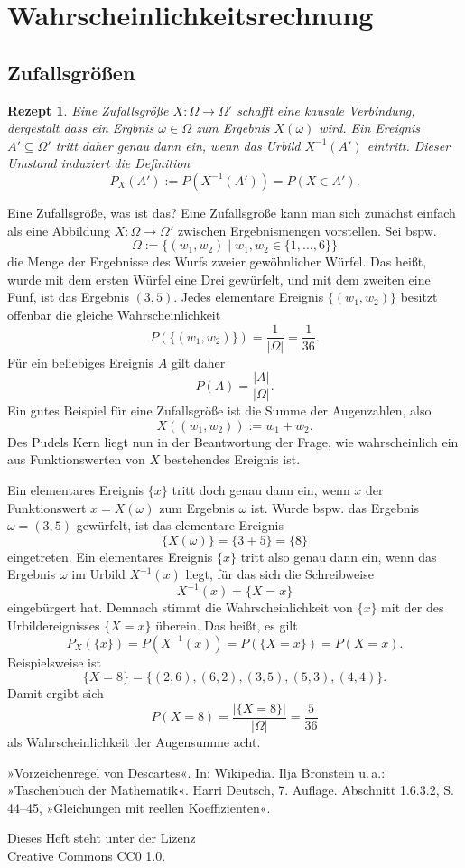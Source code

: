 \documentclass[a4paper,10pt,fleqn,twocolumn,twoside,dvipdfmx]{scrartcl}
\theoremstyle{rmbox}
\newtheorem{Rezept}{Rezept}[section]
\begin{document}
\clearpage
\section{Wahrscheinlichkeitsrechnung}

\subsection{Zufallsgrößen}

\begin{Rezept}
Eine Zufallsgröße $X\colon\Omega\to\Omega'$ schafft eine kausale
Verbindung, dergestalt dass ein Ergbnis $\omega\in\Omega$ zum
Ergebnis $X(\omega)$ wird. Ein Ereignis $A'\subseteq\Omega'$
tritt daher genau dann ein, wenn das Urbild $X^{-1}(A')$ eintritt.
Dieser Umstand induziert die Definition
\[P_X(A') := P(X^{-1}(A')) = P(X\in A').\]
\end{Rezept}

\noindent
Eine Zufallsgröße, was ist das? Eine Zufallsgröße kann man sich
zunächst einfach als eine Abbildung $X\colon\Omega\to\Omega'$ zwischen
Ergebnismengen vorstellen. Sei bspw.
\[\Omega := \{(w_1,w_2)\mid w_1,w_2\in\{1,\ldots,6\}\}\]
die Menge der Ergebnisse des Wurfs zweier gewöhnlicher
Würfel. Das heißt, wurde mit dem ersten Würfel eine Drei
gewürfelt, und mit dem zweiten eine Fünf, ist das Ergebnis $(3, 5)$.
Jedes elementare Ereignis $\{(w_1,w_2)\}$ besitzt offenbar
die gleiche Wahrscheinlichkeit%
\[P(\{(w_1,w_2)\}) = \frac{1}{|\Omega|} = \frac{1}{36}.\]
Für ein beliebiges Ereignis $A$ gilt daher%
\[P(A) = \frac{|A|}{|\Omega|}.\]
Ein gutes Beispiel für eine Zufallsgröße ist die Summe der
Augenzahlen, also%
\[X((w_1,w_2)) := w_1 + w_2.\]
Des Pudels Kern liegt nun in der Beantwortung der Frage, wie
wahrscheinlich ein aus Funktionswerten von $X$ bestehendes
Ereignis ist.

Ein elementares Ereignis $\{x\}$ tritt doch genau dann ein,
wenn $x$ der Funktionswert $x=X(\omega)$ zum Ergebnis
$\omega$ ist. Wurde bspw. das Ergebnis $\omega=(3, 5)$
gewürfelt, ist das elementare Ereignis%
\[\{X(\omega)\} = \{3 + 5\} = \{8\}\]
eingetreten.
Ein elementares Ereignis $\{x\}$ tritt also genau dann ein, wenn das
Ergebnis $\omega$ im Urbild $X^{-1}(x)$ liegt, für das sich die
Schreibweise%
\[X^{-1}(x)=\{X=x\}\]
eingebürgert hat. Demnach stimmt die Wahrscheinlichkeit von $\{x\}$
mit der des Urbildereignisses $\{X=x\}$ überein. Das heißt, es gilt%
\[P_X(\{x\}) = P(X^{-1}(x)) = P(\{X=x\}) = P(X=x).\]
Beispielsweise ist
\[\{X=8\} = \{(2,6), (6,2), (3,5), (5,3), (4,4)\}.\]
Damit ergibt sich
\[P(X=8) = \frac{|\{X=8\}|}{|\Omega|} = \frac{5}{36}\]
als Wahrscheinlichkeit der Augensumme acht.

\begin{thebibliography}{00}
 »Vorzeichenregel von Descartes«. In: Wikipedia.
 Ilja Bronstein u.\,a.: »Taschenbuch der Mathematik«.
Harri Deutsch, 7. Auflage. Abschnitt 1.6.3.2, S. 44--45, »Gleichungen mit
reellen Koeffizienten«.
\end{thebibliography}


\vfill\noindent
Dieses Heft steht unter der Lizenz\\
Creative Commons CC0 1.0.
\end{document}
